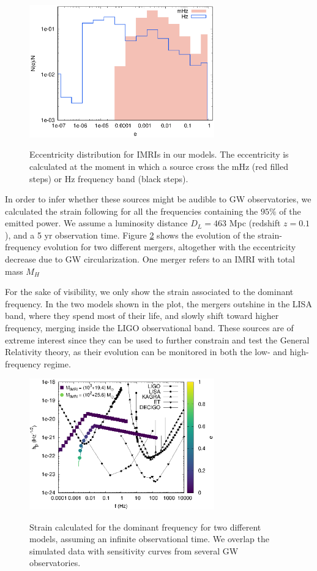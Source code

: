 \documentclass[twocolumn]{aastex62}
\begin{document}
\begin{figure}
\centering
\includegraphics[width=8cm]{mergers_eccen}\\
\caption{Eccentricity distribution for IMRIs in our models. The eccentricity is calculated at the moment in which a source cross the mHz (red filled steps) or Hz frequency band (black steps).}
\label{F11}
\end{figure}

In order to infer whether these sources might be audible to GW observatories, we calculated the strain following \cite{kocsis12} for all the frequencies containing the $95\%$ of the emitted power. We assume a luminosity distance $D_L = 463$ Mpc (redshift $z=0.1$), and a 5 yr observation time. Figure \ref{F12} shows the evolution of the strain-frequency evolution for two different mergers, altogether with the eccentricity decrease due to GW circularization. One merger refers to an IMRI with total mass $M_H$

For the sake of visibility, we only show the strain associated to the dominant frequency. In the two models shown in the plot, the mergers outshine in the LISA band, where they spend most of their life, and slowly shift toward higher frequency, merging inside the LIGO observational band. These sources are of extreme interest since they can be used to further constrain and test the General Relativity theory, as their evolution can be monitored in both the low- and high-frequency regime. 

\begin{figure}
\centering
\includegraphics[width=8cm]{example_signal}\\
\caption{Strain calculated for the dominant frequency for two different models, assuming an infinite observational time. We overlap the simulated data with sensitivity curves from several GW observatories.}
\label{F12}
\end{figure}
\end{document}
